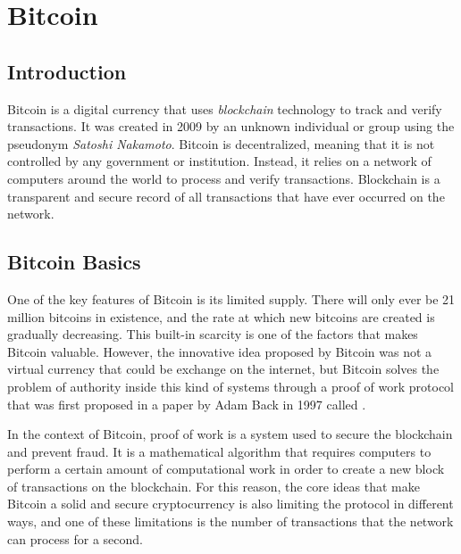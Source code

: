 \newcommand{\noteOnBitcoinNaming}[0]{\footnote{
    From now till the end of the document, we will use the word Bitcoin capitalized to identify the protocol,
    and the word bitcoin not capitalized to identify the currency
    }
}

\chapter{Bitcoin}
\label{chap:bitcoin}

\section{Introduction}

Bitcoin is a digital currency that uses \emph{blockchain} technology to track
and verify transactions. It was created in 2009 by an unknown individual or
group using the pseudonym \emph{Satoshi Nakamoto}.
Bitcoin is decentralized, meaning that it is not controlled by any government
or institution. Instead, it relies on a network of computers around the world
to process and verify transactions.
 Blockchain is a transparent and secure record of all transactions that have
ever occurred on the network.

\section{Bitcoin Basics}
\label{sec:basics}

One of the key features of Bitcoin is its limited supply. There will only ever
be 21 million bitcoins in existence, and the rate at which new bitcoins are
created is gradually decreasing. This built-in scarcity is one of the factors
that makes Bitcoin valuable.
However, the innovative idea proposed by Bitcoin was not a virtual currency that could be
exchange on the internet, but Bitcoin solves the problem of authority inside this kind
of systems through a proof of work protocol that was first proposed in a paper
by Adam Back in 1997 called  \cite{hashcash}.

In the context of Bitcoin, proof of work is a system used to secure the
blockchain and prevent fraud. It is a mathematical algorithm that requires computers
to perform a certain amount of computational work in order to create a new
block of transactions on the blockchain.
For this reason, the core ideas that make Bitcoin a solid and secure cryptocurrency 
is also limiting the protocol in different ways, and one of these limitations is the number of
transactions that the network can process for a second.

